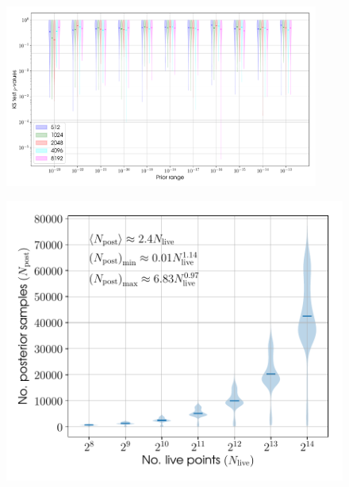 \begin{figure}[phtb]
\begin{center}
\includegraphics[width=0.92\textwidth]{./figures/proptesting/walk_uniform_prop/kstest/collate_plots_wup_ks}
\caption{ \protect}
\end{center}
\end{figure}


\begin{figure}[!phtb]
\begin{center}
\includegraphics[width=1\columnwidth]{./figures/codeeval/stats/numposts/numposts}
\caption{ \protect}
\end{center}
\end{figure}


